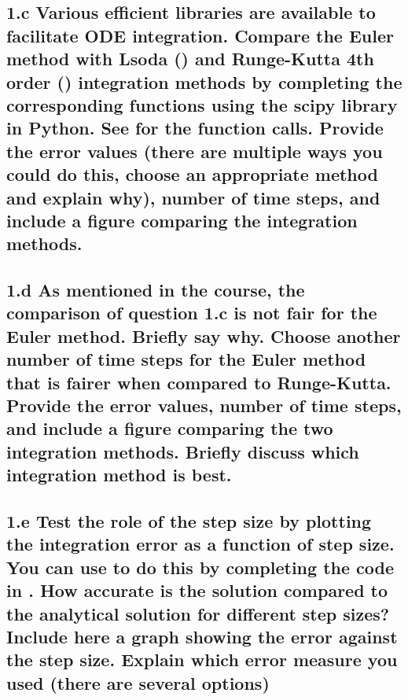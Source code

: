 \documentclass{cmc}
\begin{document}
\vspace{0.3\textheight}



\clearpage

\subsection*{1.c Various efficient libraries are available to facilitate ODE
  integration. Compare the Euler method with Lsoda
  () %
  and Runge-Kutta 4th order
  () %
  integration methods by completing the corresponding functions using the scipy
  library in Python. See  %
  for the function calls. Provide the error values (there are multiple ways you
  could do this, choose an appropriate method and explain why), number of time
  steps, and include a figure comparing the integration methods. }



\vspace{0.3\textheight}



\clearpage

\subsection*{1.d As mentioned in the course, the comparison of question 1.c is
  not fair for the Euler method.  Briefly say why. Choose another number of time
  steps for the Euler method that is fairer when compared to
  Runge-Kutta. Provide the error values, number of time steps, and include a
  figure comparing the two integration methods. Briefly discuss which
  integration method is best.}



\vspace{0.3\textheight}



\clearpage

\subsection*{1.e Test the role of the step size by plotting the integration
  error as a function of step size. You can use
  to do this by completing the code in
  . %
  How accurate is the solution compared to the analytical solution for different
  step sizes?  Include here a graph showing the error against the step
  size. Explain which error measure you used (there are several options)}
\end{document}
